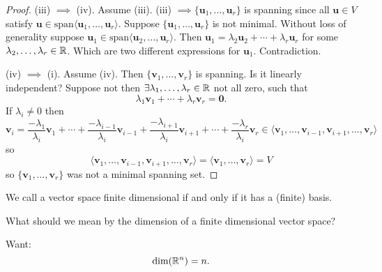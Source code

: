 \documentclass[10pt, a4paper]{article}
\newcommand{\mbf}[1]{\mathbf{#1}}
\begin{document}
\begin{theorem}
\begin{proof}
        (iii) $\implies$ (iv).
        Assume (iii).
        (iii) $\implies \{\mbf{u}_1, \dotsc, \mbf{u}_r\}$ is spanning since all $\mbf{u} \in V$ satisfy $\mbf{u} \in \mathrm{span}\langle\mbf{u}_1, \dotsc, \mbf{u}_r\rangle$.
        Suppose $\{\mbf{u}_1, \dotsc, \mbf{u}_r\}$ is not minimal.
        Without loss of generality suppose $\mbf{u}_1 \in \mathrm{span}\langle\mbf{u}_2, \dotsc, \mbf{u}_r\rangle$.
        Then $\mbf{u}_1 = \lambda_2\mbf{u}_2 + \dotsi + \lambda_r\mbf{u}_r$ for some $\lambda_2, \dotsc, \lambda_r \in \mathbb{R}$.
        Which are two different expressions for $\mbf{u}_1$.
        Contradiction.

        (iv) $\implies$ (i).
        Assume (iv).
        Then $\{\mbf{v}_1, \dotsc, \mbf{v}_r\}$ is spanning.
        Is it linearly independent?
        Suppose not then $\exists\lambda_1, \dotsc, \lambda_r \in \mathbb{R}$ not all zero,
        such that
        \[
        \lambda_1\mbf{v}_1 + \dotsi + \lambda_r\mbf{v}_r = \mbf{0}.
        \]
        If $\lambda_i \neq 0$ then
        \[
        \mbf{v}_i = \frac{-\lambda_1}{\lambda_i}\mbf{v}_1 + \dotsi + \frac{-\lambda_{i - 1}}{\lambda_i}\mbf{v}_{i - 1} + \frac{-\lambda_{i + 1}}{\lambda_i}\mbf{v}_{i + 1} + \dotsi + \frac{-\lambda_r}{\lambda_i}\mbf{v}_r \in \langle\mbf{v}_1, \dotsc, \mbf{v}_{i - 1}, \mbf{v}_{i + 1}, \dotsc, \mbf{v}_r\rangle
        \]
        so
        \[
        \langle\mbf{v}_1, \dotsc, \mbf{v}_{i - 1}, \mbf{v}_{i + 1}, \dotsc, \mbf{v}_r\rangle = \langle\mbf{v}_1, \dotsc, \mbf{v}_r\rangle = V
        \]
        so $\{\mbf{v}_1, \dotsc, \mbf{v}_r\}$ was not a minimal spanning set.
        
    \end{proof}
\end{theorem}

\begin{definition}
    We call a vector space finite dimensional if and only if it has a
    (finite)
    basis.
\end{definition}

What should we mean by the dimension of a finite dimensional vector space?

Want:
\[
\dim(\mathbb{R} ^ n) = n.
\]
\end{document}

